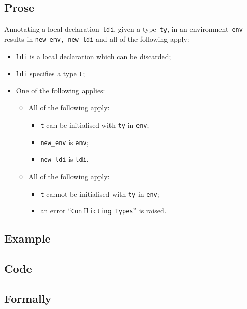 \documentclass{book}
\begin{document}
  \subsection{Prose}
    Annotating a local declaration~\texttt{ldi}, given a type~\texttt{ty}, in
an environment~\texttt{env} results in \texttt{new\_env, new\_ldi} and all of
the following apply:
   \begin{itemize}
   \item \texttt{ldi} is a local declaration which can be discarded;
   \item \texttt{ldi} specifies a type \texttt{t};
   \item One of the following applies:
     \begin{itemize}
     \item All of the following apply:
       \begin{itemize}
       \item \texttt{t} can be initialised with \texttt{ty} in \texttt{env};
       \item \texttt{new\_env} is \texttt{env};
       \item \texttt{new\_ldi} is \texttt{ldi}.
       \end{itemize}
     \item All of the following apply:
       \begin{itemize}
       \item \texttt{t} cannot be initialised with \texttt{ty} in \texttt{env};
       \item an error ``\texttt{Conflicting Types}'' is raised.
       \end{itemize}
     \end{itemize}
   \end{itemize}

  \subsection{Example}

  \subsection{Code}

\begin{emptyformal}
    \subsection{Formally}
\end{emptyformal}
\end{document}
